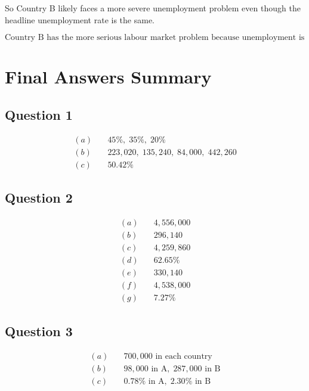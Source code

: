 \documentclass[12pt]{article}
\begin{document}
So Country B likely faces a more severe unemployment problem even though the headline unemployment rate is the same.

\[
\boxed{\text{Country B has the more serious labour market problem because unemployment is more persistent.}}
\]

\vspace{1em}

\section*{Final Answers Summary}

\subsection*{Question 1}
\begin{align*}
(a)\quad & 45\%,\; 35\%,\; 20\% \\
(b)\quad & 223{,}020,\; 135{,}240,\; 84{,}000,\; 442{,}260 \\
(c)\quad & 50.42\%
\end{align*}

\subsection*{Question 2}
\begin{align*}
(a)\quad & 4{,}556{,}000 \\
(b)\quad & 296{,}140 \\
(c)\quad & 4{,}259{,}860 \\
(d)\quad & 62.65\% \\
(e)\quad & 330{,}140 \\
(f)\quad & 4{,}538{,}000 \\
(g)\quad & 7.27\%
\end{align*}

\subsection*{Question 3}
\begin{align*}
(a)\quad & 700{,}000 \text{ in each country} \\
(b)\quad & 98{,}000 \text{ in A},\; 287{,}000 \text{ in B} \\
(c)\quad & 0.78\% \text{ in A},\; 2.30\% \text{ in B}
\end{align*}
\end{document}
